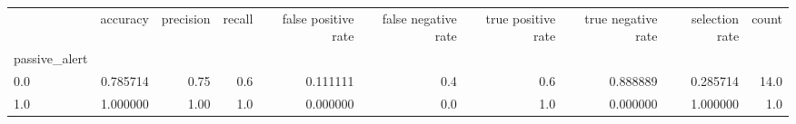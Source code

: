 \begin{tabular}{lrrrrrrrrr}
\toprule
{} &  accuracy &  precision &  recall &  false positive rate &  false negative rate &  true positive rate &  true negative rate &  selection rate &  count \\
passive\_alert &           &            &         &                      &                      &                     &                     &                 &        \\
\midrule
0.0           &  0.785714 &       0.75 &     0.6 &             0.111111 &                  0.4 &                 0.6 &            0.888889 &        0.285714 &   14.0 \\
1.0           &  1.000000 &       1.00 &     1.0 &             0.000000 &                  0.0 &                 1.0 &            0.000000 &        1.000000 &    1.0 \\
\bottomrule
\end{tabular}
